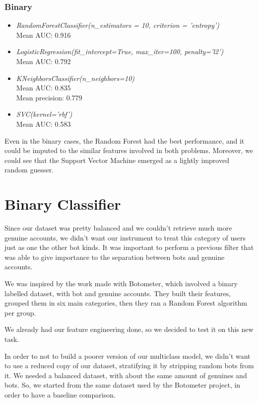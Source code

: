 \subsubsection{Binary}
\begin{itemize}
	\item[\PencilRight] \textit{RandomForestClassifier(n\_estimators = 10, criterion = 'entropy')}\\
	Mean AUC: 0.916\\
	\item[\PencilRight]\textit{LogisticRegression(fit\_intercept=True, max\_iter=100, penalty='l2')}\\
	Mean AUC: 0.792\\
	\item[\PencilRight]\textit{KNeighborsClassifier(n\_neighbors=10)}\\
	Mean AUC: 0.835\\
	Mean precision: 0.779\\
	\item[\PencilRight]\textit{SVC(kernel='rbf')}\\
	Mean AUC: 0.583\\
\end{itemize}
Even in the binary cases, the Random Forest had the best performance, and it could be imputed to the similar features involved in both problems. Moreover, we could see that the Support Vector Machine emerged as a lightly improved random guesser.


\section{Binary Classifier}
Since our dataset was pretty balanced and we couldn't retrieve much more genuine accounts, we didn't want our instrument to treat this category of users just as one the other bot kinds. It was important to perform a previous filter that was able to give importance to the separation between bots and genuine accounts.

We was inspired by the work made with Botometer\cite{Botometer}, which involved a binary labelled dataset, with bot and genuine accounts.
They built their features, grouped them in six main categories, then they ran a Random Forest algorithm per group.

We already had our feature engineering done, so we decided to test it on this new task.

In order to not to build a poorer version of our multiclass model, we didn't want to use a reduced copy of our dataset, stratifying it by stripping random bots from it. We needed a balanced dataset, with about the same amount of genuines and bots. So, we started from the same dataset used by the Botometer project, in order to have a baseline comparison.
